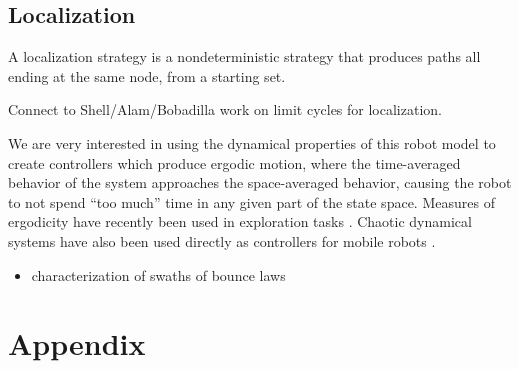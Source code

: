 \documentclass[]{styles/svproc}  %
\begin{document}
\subsection{Localization}

\begin{definition}
A localization strategy is a nondeterministic strategy that produces paths all
ending at the same node, from a starting set.
\end{definition}

Connect to Shell/Alam/Bobadilla work on limit cycles for localization.


We are very interested in using the dynamical properties of this robot model to
create controllers which produce ergodic motion, where the time-averaged
behavior of the system approaches the space-averaged behavior, causing the robot
to not spend ``too much'' time in any given part of the state space. Measures
of ergodicity have recently been used in exploration tasks
\cite{miller2016ergodic}. Chaotic dynamical systems have also been used directly
as controllers for mobile robots \cite{nakamura2001chaotic}.

{\color{red} 
\begin{itemize}
\item characterization of swaths of bounce laws
\end{itemize}
}

%
%
%




\newpage
\section{Appendix}
\end{document}
